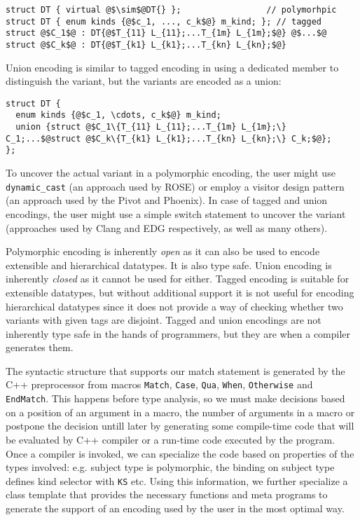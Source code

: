 \documentclass{llncs}
\makeatletter
\DeclareRobustCommand{\code}[1]{{\lstinline[keepspaces,breaklines=false,escapechar=@]{#1}}}
\makeatother
\begin{document}
\begin{lstlisting}[keepspaces,columns=flexible]
struct DT { virtual @$\sim$@DT{} };                 // polymorhpic
struct DT { enum kinds {@$c_1, ..., c_k$@} m_kind; }; // tagged
struct @$C_1$@ : DT{@$T_{11} L_{11};...T_{1m} L_{1m};$@} @$...$@ struct @$C_k$@ : DT{@$T_{k1} L_{k1};...T_{kn} L_{kn};$@} 
\end{lstlisting}

\noindent
Union encoding is similar to tagged encoding in using a dedicated member to 
distinguish the variant, but the variants are encoded as a union:

\begin{lstlisting}[keepspaces,columns=flexible]
struct DT {
  enum kinds {@$c_1, \cdots, c_k$@} m_kind;
  union {struct @$C_1\{T_{11} L_{11};...T_{1m} L_{1m};\} C_1;...$@struct @$C_k\{T_{k1} L_{k1};...T_{kn} L_{kn};\} C_k;$@};
};
\end{lstlisting}

\noindent
To uncover the actual variant in a polymorphic encoding, the user might use 
\code{dynamic_cast} (an approach used by ROSE\cite{SQ03}) or employ a visitor 
design pattern (an approach used by 
the Pivot\cite{Pivot09} and Phoenix\cite{Phoenix}). In case of tagged and union 
encodings, the user might use a simple switch statement to uncover the variant 
(approaches used by Clang\cite{Clang} and EDG\cite{EDG} respectively, as well as 
many others).

Polymorphic encoding is inherently \emph{open} as it can also be used to encode 
extensible and hierarchical datatypes. It is also type safe. Union encoding is inherently 
\emph{closed} as it cannot be used for either. Tagged encoding is suitable for 
extensible datatypes, but without additional support it is not useful for 
encoding hierarchical datatypes since it does not provide a way of checking 
whether two variants with given tags are disjoint.
Tagged and union encodings are not inherently type safe in the hands of 
programmers, but they are when a compiler generates them.

The syntactic structure that supports our match statement is generated by the 
C++ preprocessor from macros \code{Match}, \code{Case}, \code{Qua}, \code{When}, 
\code{Otherwise} and \code{EndMatch}. This happens before type analysis,
so we must make 
decisions based on a position of an argument in a macro, the number of arguments 
in a macro or postpone the decision untill later by generating some compile-time 
code that will be evaluated by C++ compiler or a run-time code executed by the 
program. Once a compiler is invoked, we can specialize the code based on 
properties of the types involved: e.g. subject type is polymorphic, the binding 
on subject type defines kind selector with \code{KS} etc. Using this information, 
we further specialize a class template that provides the necessary functions and 
meta programs to generate the support of an encoding used by the user in the 
most optimal way.
\end{document}
